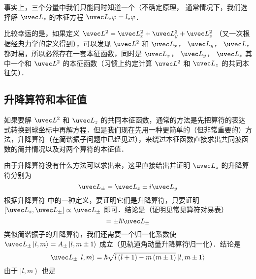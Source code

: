 事实上，三个分量中我们只能同时知道一个（不确定原理，%
通常情况下，我们选择解 ${\uvec L_z}$ 的本征方程 ${\uvec L_z}\varphi  = {l_z}\varphi $． 

比较幸运的是，如果定义 ${\uvec L^2} = \uvec L_x^2 + \uvec L_y^2 + \uvec L_z^2$ （又一次根据经典力学的定义得到），可以发现 $\uvec L^2$ 和 $\uvec L_x$， $\uvec L_y$，  $\uvec L_z$ 都对易，所以必然存在一套本征函数，同时是 $\uvec L_x$， $\uvec L_y$，  $\uvec L_z$ 其中一个和 $\uvec L^2$ 的本征函数（习惯上约定计算 $\uvec L^2$ 和 $\uvec L_z$ 的共同本征矢）．

\subsection{升降算符和本征值}

如果要解 $\uvec L^2$ 和 $\uvec L_z$ 的共同本征函数，通常的方法是先把算符的表达式转换到球坐标中再解方程．但是我们现在先用一种更简单的（但非常重要的）方法，升降算符（在简谐振子问题中已经见过），来绕过本征函数直接求出共同波函数的简并情况以及对两个算符的本征值．

由于升降算符没有什么方法可以求出来，这里直接给出并证明 $\uvec L_z$ 的升降算符分别为
\begin{equation}
{\uvec L_ \pm } = {\uvec L_x} \pm i{\uvec L_y}
\end{equation}
根据升降算符%
中的一种定义，要证明它们是升降算符，只要证明 $[{\uvec L_z},{\uvec L_ \pm }] \propto {\uvec L_ \pm }$ 即可．结论是（证明见常见算符对易表）%
\begin{equation}
[{\uvec L_z},{\uvec L_ \pm }] =  \pm \hbar {\uvec L_ \pm }
\end{equation}
类似简谐振子的升降算符，我们还需要一个归一化系数使 ${\uvec L_ \pm }\left| {l,m} \right\rangle  = {A_ \pm }\left| {l,m \pm 1} \right\rangle $ 成立（见轨道角动量升降算符归一化）．结论是
\begin{equation}
{\uvec L_ \pm }\left| {l,m} \right\rangle  = \hbar \sqrt {l\left( {l + 1} \right) - m\left( {m \pm 1} \right)} \left| {l,m \pm 1} \right\rangle 
\end{equation}
由于 $\left| {l,m} \right\rangle $ 也是



